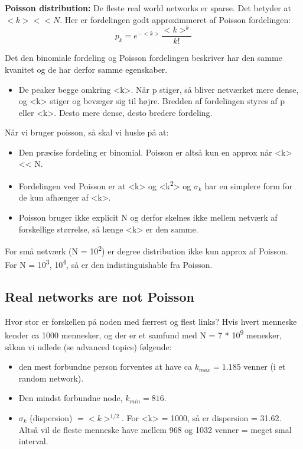 \documentclass[11pt]{article}
\begin{document}
\textbf{Poisson distribution:} De fleste real world networks er sparse. Det betyder at \(<k> << N\).  Her er fordelingen godt approximmeret af Poisson fordelingen: $$ p_{k} = e^{-<k>} \frac{<k>^{k}}{k!} $$

Det den binomiale fordeling og Poisson fordelingen beskriver har den samme kvanitet og de har derfor samme egenskaber.
\begin{itemize}
\item De peaker begge omkring <k>. Når p stiger, så bliver netværket mere dense, og <k> stiger og bevæger sig til højre. Bredden af fordelingen styres af p eller <k>. Desto mere dense, desto bredere fordeling.
\end{itemize}

Når vi bruger poisson, så skal vi huske på at:
\begin{itemize}
\item Den præcise fordeling er binomial. Poisson er altså kun en approx når <k> << N.
\item Fordelingen ved Poisson er at <k> og <k\textsuperscript{2}> og \(\sigma_k\) har en simplere form for de kun afhænger af <k>.
\item Poisson bruger ikke explicit N og derfor skelnes ikke mellem netværk af forskellige størrelse, så længe <k> er den samme.
\end{itemize}

For små netværk (N = 10\textsuperscript{2}) er degree distribution ikke kun approx af Poisson. For N = 10\textsuperscript{3}, 10\textsuperscript{4}, så er den indistinguishable fra Poisson. 

\subsection{Real networks are not Poisson}
\label{sec:org4066fa0}
Hvor stor er forskellen på noden med færrest og flest links? Hvis hvert menneske kender ca 1000 mennesker, og der er et samfund med N = 7 * 10\textsuperscript{9} menesker, såkan vi udlede (se advanced topics) følgende:
\begin{itemize}
\item den mest forbundne person forventes at have ca \(k_{max} = 1.185\) venner (i et random network).
\item Den mindst forbundne node, \(k_{min} = 816\).
\item \(\sigma_{k}\) (dispersion) \(= <k>^{1/2}\). For <k> = 1000, så er dispersion = 31.62. Altså vil de fleste menneske have mellem 968 og 1032 venner = meget smal interval.
\end{itemize}
\end{document}
